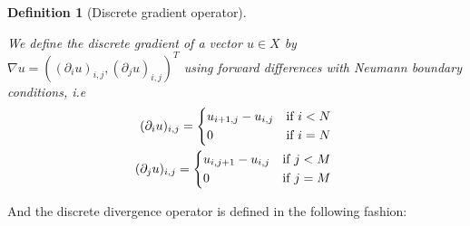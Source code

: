\documentclass{scrreprt}
\newtheorem{definition}[theorem]{Definition}
\begin{document}
        \begin{definition}[Discrete gradient operator] %
        \label{def:discrete_gradient_operator}

            We define the discrete gradient of a vector $u \in X$ by $\nabla u = ((\partial_{i}u)_{i, j}, (\partial_{j}u)_{i, j})^{T}$ using forward differences with Neumann boundary conditions, i.e
                \begin{eqnarray}
                    (\partial_{i}u)_{i, j} =
                        \begin{dcases*}
                            u_{i+1, j} - u_{i, j} & \textnormal{if $i < N$}\\
                            0 & \textnormal{if $i = N$}
                        \end{dcases*} \notag \\
                    (\partial_{j}u)_{i, j} =
                        \begin{dcases*}
                            u_{i, j+1} - u_{i, j} & \textnormal{if $j < M$}\\
                            0 & \textnormal{if $j = M$}
                        \end{dcases*} \notag
                \end{eqnarray}

        \end{definition}

        And the discrete divergence operator is defined in the following fashion:
\end{document}
